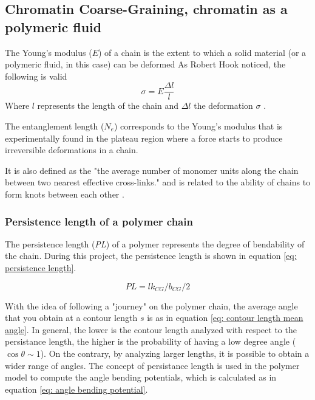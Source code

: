 
\subsection{Chromatin Coarse-Graining, chromatin as a polymeric fluid}

The Young's modulus ($E$) of a chain is the extent to which a solid material (or a polymeric fluid, in this case) can be deformed
As Robert Hook noticed, the following is valid 
\begin{equation}
    \sigma = E \frac{\Delta l}{l}
\end{equation}
Where $l$ represents the length of the chain and $\Delta l$ the deformation $\sigma$
\cite{grosbergGiantMoleculesHere2011}
.

The entanglement length ($N_e$) corresponds to the Young's modulus that is experimentally found in the plateau region where a force starts to produce irreversible deformations in a chain.



It is also defined as the "the average number of monomer units along the chain between two nearest effective cross-links."
and is related to the ability of chains to form knots between each other
\cite{grosbergGiantMoleculesHere2011}
.



\subsubsection{Persistence length of a polymer chain}

The persistence length (\textit{PL}) of a polymer represents the degree of bendability of the chain. During this project, the persistence length is shown in equation \ref{eq: persistence length}.


\begin{equation}
    PL = lk_{CG} / b_{CG} / 2
\end{equation}

With the idea of following a "journey" on the polymer chain, the average angle that you obtain at a contour length $s$ is as in equation \ref{eq: contour length mean angle}. In general, the lower is the contour length analyzed with respect to the persistance length, the higher is the probability of having a low degree angle ($\cos{\theta} \sim 1$). On the contrary, by analyzing larger lengths, it is possible to obtain a wider range of angles.
The concept of persistance length is used in the polymer model to compute the angle bending potentials, which is calculated as in equation \ref{eq: angle bending potential}.


